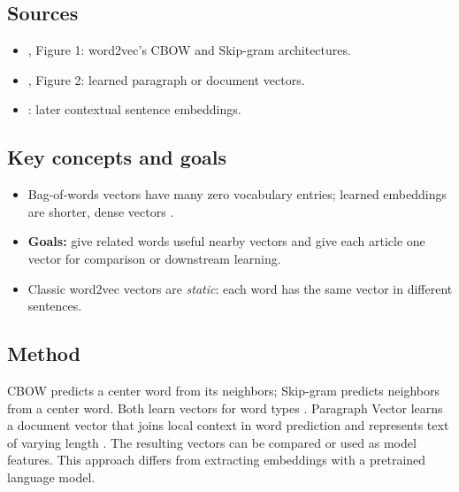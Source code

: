 \documentclass[11pt]{article}
\begin{document}
\subsection*{Sources}
\begin{itemize}
  \item \textcite{mikolov2013}, Figure 1: word2vec's CBOW and Skip-gram architectures.
  \item \textcite{le2014}, Figure 2: learned paragraph or document vectors.
  \item \textcite{reimers2019}: later contextual sentence embeddings.
\end{itemize}

\subsection*{Key concepts and goals}
\begin{itemize}
  \item Bag-of-words vectors have many zero vocabulary entries; learned embeddings are shorter, dense vectors \parencite{mikolov2013,le2014}.
  \item \textbf{Goals:} give related words useful nearby vectors and give each article one vector for comparison or downstream learning.
  \item Classic word2vec vectors are \emph{static}: each word has the same vector in different sentences.
\end{itemize}

\subsection*{Method}
CBOW predicts a center word from its neighbors; Skip-gram predicts neighbors from a center word. Both learn vectors for word types \parencite{mikolov2013}. Paragraph Vector learns a document vector that joins local context in word prediction and represents text of varying length \parencite{le2014}. The resulting vectors can be compared or used as model features. This approach differs from extracting embeddings with a pretrained language model.
\end{document}
